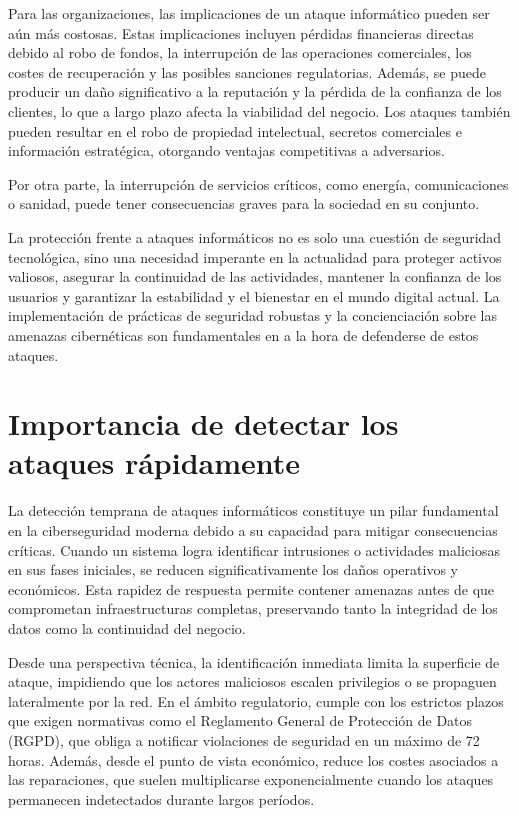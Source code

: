 Para las organizaciones, las implicaciones de un ataque informático pueden ser aún más costosas. Estas implicaciones incluyen pérdidas financieras directas debido al robo de fondos, la interrupción de las operaciones comerciales, los costes de recuperación y las posibles sanciones regulatorias. Además, se puede producir un daño significativo a la reputación y la pérdida de la confianza de los clientes, lo que a largo plazo afecta la viabilidad del negocio. Los ataques también pueden resultar en el robo de propiedad intelectual, secretos comerciales e información estratégica, otorgando ventajas competitivas a adversarios. 

Por otra parte, la interrupción de servicios críticos, como energía, comunicaciones o sanidad, puede tener consecuencias graves para la sociedad en su conjunto.

La protección frente a ataques informáticos no es solo una cuestión de seguridad tecnológica, sino una necesidad imperante en la actualidad para proteger activos valiosos, asegurar la continuidad de las actividades, mantener la confianza de los usuarios y garantizar la estabilidad y el bienestar en el mundo digital actual. La implementación de prácticas de seguridad robustas y la concienciación sobre las amenazas cibernéticas son fundamentales en a la hora de defenderse de estos ataques.


\section{Importancia de detectar los ataques rápidamente}

La detección temprana de ataques informáticos constituye un pilar fundamental en la ciberseguridad moderna debido a su capacidad para mitigar consecuencias críticas. Cuando un sistema logra identificar intrusiones o actividades maliciosas en sus fases iniciales, se reducen significativamente los daños operativos y económicos. Esta rapidez de respuesta permite contener amenazas antes de que comprometan infraestructuras completas, preservando tanto la integridad de los datos como la continuidad del negocio.

Desde una perspectiva técnica, la identificación inmediata limita la superficie de ataque, impidiendo que los actores maliciosos escalen privilegios o se propaguen lateralmente por la red. En el ámbito regulatorio, cumple con los estrictos plazos que exigen normativas como el Reglamento General de Protección de Datos (RGPD), que obliga a notificar violaciones de seguridad en un máximo de 72 horas. Además, desde el punto de vista económico, reduce los costes asociados a las reparaciones, que suelen multiplicarse exponencialmente cuando los ataques permanecen indetectados durante largos períodos.


